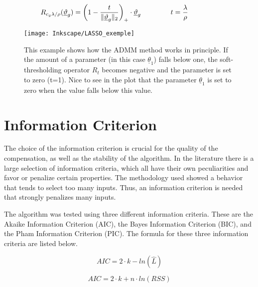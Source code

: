  \begin{equation}
	R_{c_g \lambda/ \rho}(\underline{\vartheta}_g) =\biggl( 1-\frac{t}{\Vert \underline{\vartheta}_g \Vert_2}\biggr)_+  \cdot\underline{\vartheta}_g \hspace{1.5cm} t=\frac{\lambda}{\rho} \hspace{1.5cm}
	\label{eq:thresholdop}
\end{equation}




\begin{figure}[!htb]
    \centering
    \texttt{[image: Inkscape/LASSO\_exemple]} %
    \caption[Example of 2D Group LASSO Problem]{This example shows how the ADMM method works in principle. If the amount of a parameter (in this case $\underline{\theta}_1$) falls below one, the soft-thresholding operator $R_t$ becomes negative and the parameter is set to zero (t=1). Nice to see in the plot that the parameter $\underline{\theta}_1$ is set to zero when the value falls below this value. 
}
    \label{fig:LASSO_exemple}
\end{figure}



\section{Information Criterion}
\label{sec:Information_Criterion}

The choice of the information criterion is crucial for the quality of the compensation, as well as the stability of the algorithm. In the literature there is a large selection of information criteria, which all have their own peculiarities and favor or penalize certain properties. The methodology used showed a behavior that tends to select too many inputs. Thus, an information criterion is needed that strongly penalizes many inputs. 

The algorithm was tested using three different information criteria. These are the Akaike Information Criterion (AIC), the Bayes Information Criterion (BIC), and the Pham Information Criterion (PIC). The formula for these three information criteria are listed below.


 \begin{equation}
	AIC = 2 \cdot k-ln(\hat{L})
	\label{eq:aic_general}
\end{equation}
	


 \begin{equation}
	AIC = 2 \cdot k+n \cdot ln(RSS)
	\label{eq:aic_rms}
\end{equation}


